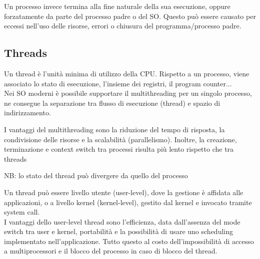 \documentclass[12pt, a4paper]{article}
\begin{document}
Un processo invece termina alla fine naturale della sua esecuzione, oppure forzatamente da parte del processo padre
o del SO. Questo può essere causato per eccessi nell'uso delle risorse, errori o chiusura del programma/processo padre.

\subsection{Threads}
Un thread è l'unità minima di utilizzo della CPU. Rispetto a un processo, viene associato lo stato di esecuzione, 
l'insieme dei registri, il program counter...\\
Nei SO moderni è possibile supportare il multithreading per un singolo processo, ne consegue la separazione tra 
flusso di esecuzione (thread) e spazio di indirizzamento.

I vantaggi del multithreading sono la riduzione del tempo di risposta, la condivisione delle risorse e la scalabilità 
(parallelismo). Inoltre, la creazione, terminazione e context switch tra processi risulta più lento rispetto che tra
threads

NB: lo stato del thread può divergere da quello del processo

Un thread può essere livello utente (user-level), dove la gestione è affidata alle applicazioni, o a livello kernel
(kernel-level), gestito dal kernel e invocato tramite system call.\\
I vantaggi dello user-level thread sono l'efficienza, data dall'assenza del mode switch tra user e kernel, portabilità
e la possibilità di usare uno scheduling implementato nell'applicazione. Tutto questo al costo dell'impossibilità 
di accesso a multiprocessori e il blocco del processo in caso di blocco del thread.
\end{document}
